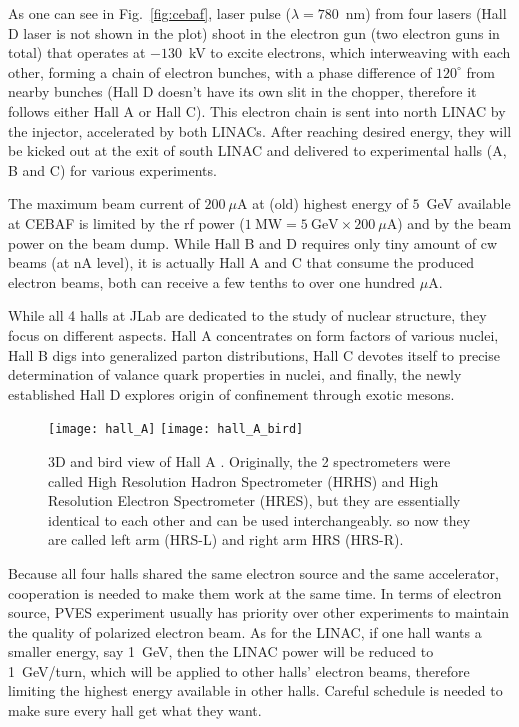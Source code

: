 As one can see in Fig.~\ref{fig:cebaf}, laser pulse ($\lambda = 780$~nm) from four lasers 
(Hall D laser is not shown in the plot) shoot in the electron gun 
(two electron guns in total) that 
operates at $-130$~kV to excite electrons, which interweaving with each other, 
forming a chain of electron bunches, with a phase difference of $120^\circ$ from 
nearby bunches (Hall D doesn't have its own slit in the chopper, therefore 
it follows either Hall A or Hall C). This electron chain is sent into north LINAC
by the injector, accelerated by both LINACs. After reaching desired energy,
they will be kicked out at the exit of south LINAC and delivered to experimental
halls (A, B and C) for various experiments. 

The maximum beam current of $200\ \mu$A at (old) highest energy of $5$~GeV 
available at CEBAF is limited by the rf power ($1\ \mathrm{MW} = 5\ \mathrm{GeV} \times 200\ \mu\mathrm{A}$) 
and by the beam power on the beam dump. While Hall B and D requires only tiny 
amount of cw beams (at nA level), it is actually Hall A and C that consume 
the produced electron beams, both can receive a few tenths to over one 
hundred $\mu$A.

While all 4 halls at JLab are dedicated to the study of nuclear structure, they
focus on different aspects. Hall A concentrates on form factors of various nuclei, 
Hall B digs into generalized parton distributions, Hall C devotes itself to precise
determination of valance quark properties in nuclei, and finally, the newly 
established Hall D explores origin of confinement through exotic mesons.
\begin{figure}[h!]
    \centering
    \texttt{[image: hall\_A]}
    \texttt{[image: hall\_A\_bird]}
    \caption{3D and bird view of Hall A \cite{halla_manual}. Originally, the 2 spectrometers
    were called High Resolution Hadron Spectrometer (HRHS) and High Resolution Electron
    Spectrometer (HRES), but they are essentially identical to each other and
    can be used interchangeably.
    so now they are called left arm (HRS-L) and right arm HRS (HRS-R).
    }
\end{figure}

Because all four halls shared the same electron source and the same accelerator, 
cooperation is needed to make them work at the same time. In terms of electron
source, PVES experiment usually has priority over other experiments to maintain 
the quality of polarized electron beam. As for the LINAC, if one hall wants
a smaller energy, say 1~GeV, then the LINAC power will be reduced to 1~GeV/turn,
which will be applied to other halls' electron beams, therefore limiting the 
highest energy available in other halls. Careful schedule is needed to make sure
every hall get what they want.
